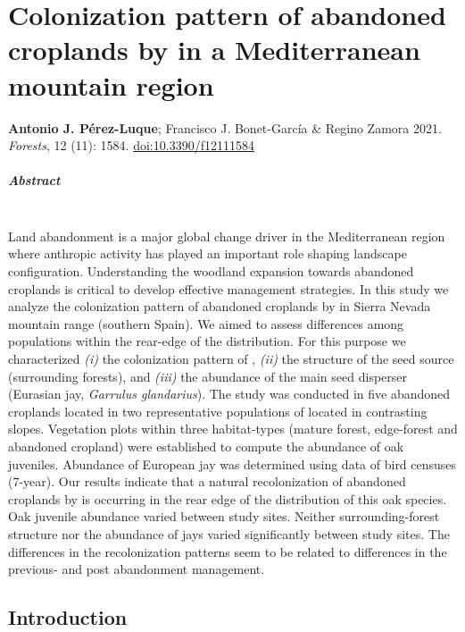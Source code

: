 %
\chapter{\textcolor{ctcolormain}{
Colonization pattern of abandoned croplands by \Qp in a Mediterranean mountain region}}\label{sec:coloniza}


\mbox{}
\vfill
{\color{ctcolormain}\textbf{Antonio J. Pérez-Luque}}; Francisco J. Bonet-García \& Regino Zamora 
2021. \emph{Forests}, 12 (11): 1584. \href{https://dx.doi.org/10.3390/f12111584}{doi:10.3390/f12111584}


\newpage

\paragraph{Abstract} \mbox{} \\
Land abandonment is a major global change driver in the Mediterranean region where anthropic activity has played an important role shaping landscape configuration. Understanding the woodland expansion towards abandoned croplands is critical to develop effective management strategies. In this study we analyze the colonization pattern of abandoned croplands by \Qpy in Sierra Nevada mountain range (southern Spain). We aimed to assess differences among populations within the rear-edge of the \Qp distribution. For this purpose we characterized \emph{(i)} the colonization pattern of \Qp, \emph{(ii)} the structure of the seed source (surrounding forests), and \emph{(iii)} the abundance of the main seed disperser (Eurasian jay, \emph{Garrulus glandarius}). The study was conducted in five abandoned croplands located in two representative populations of \Qp located in contrasting slopes. Vegetation plots within three habitat-types (mature forest, edge-forest and abandoned cropland) were established to compute the abundance of oak juveniles. Abundance of European jay was determined using data of bird censuses (7-year). Our results indicate that a natural recolonization of abandoned croplands by \Qp is occurring in the rear edge of the distribution of this oak species. Oak juvenile abundance varied between study sites. Neither surrounding-forest structure nor the abundance of jays varied significantly between study sites. The differences in the recolonization patterns seem to be related to differences in the previous- and post abandonment management.
\newpage

\section{Introduction}\label{sec:coloniza:intro}

